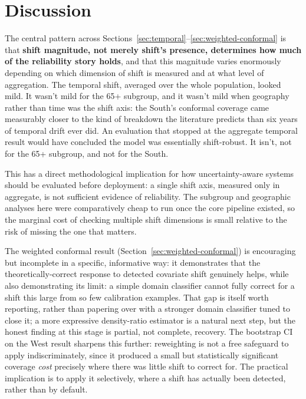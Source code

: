 \documentclass[11pt]{article}
\begin{document}
\section{Discussion}

The central pattern across Sections~\ref{sec:temporal}--\ref{sec:weighted-conformal} is that \textbf{shift magnitude, not merely shift's presence, determines how much of the reliability story holds}, and that this magnitude varies enormously depending on which dimension of shift is measured and at what level of aggregation. The temporal shift, averaged over the whole population, looked mild. It wasn't mild for the 65+ subgroup, and it wasn't mild when geography rather than time was the shift axis: the South's conformal coverage came measurably closer to the kind of breakdown the literature predicts \citep{tibshirani2019conformal} than six years of temporal drift ever did. An evaluation that stopped at the aggregate temporal result would have concluded the model was essentially shift-robust. It isn't, not for the 65+ subgroup, and not for the South.

This has a direct methodological implication for how uncertainty-aware systems should be evaluated before deployment: a single shift axis, measured only in aggregate, is not sufficient evidence of reliability. The subgroup and geographic analyses here were comparatively cheap to run once the core pipeline existed, so the marginal cost of checking multiple shift dimensions is small relative to the risk of missing the one that matters.

The weighted conformal result (Section~\ref{sec:weighted-conformal}) is encouraging but incomplete in a specific, informative way: it demonstrates that the theoretically-correct response to detected covariate shift genuinely helps, while also demonstrating its limit: a simple domain classifier cannot fully correct for a shift this large from so few calibration examples. That gap is itself worth reporting, rather than papering over with a stronger domain classifier tuned to close it; a more expressive density-ratio estimator is a natural next step, but the honest finding at this stage is partial, not complete, recovery. The bootstrap CI on the West result sharpens this further: reweighting is not a free safeguard to apply indiscriminately, since it produced a small but statistically significant coverage \emph{cost} precisely where there was little shift to correct for. The practical implication is to apply it selectively, where a shift has actually been detected, rather than by default.
\end{document}
